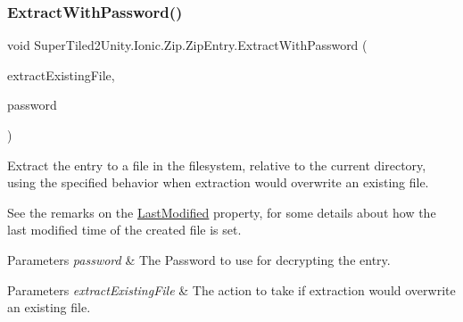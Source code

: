 \subsubsection{\texorpdfstring{Extract\+With\+Password()}{ExtractWithPassword()}\hspace{0.1cm}{\footnotesize\ttfamily [3/5]}}
{\footnotesize\ttfamily void Super\+Tiled2\+Unity.\+Ionic.\+Zip.\+Zip\+Entry.\+Extract\+With\+Password (\begin{DoxyParamCaption}\item[{\mbox{\hyperlink{namespace_super_tiled2_unity_1_1_ionic_1_1_zip_a3f8db7242d746d36b45114257b4fe4c0}{Extract\+Existing\+File\+Action}}}]{extract\+Existing\+File,  }\item[{string}]{password }\end{DoxyParamCaption})}



Extract the entry to a file in the filesystem, relative to the current directory, using the specified behavior when extraction would overwrite an existing file. 

See the remarks on the \mbox{\hyperlink{class_super_tiled2_unity_1_1_ionic_1_1_zip_1_1_zip_entry_acd1234fd27c216b59c166c2b96aba3dd}{Last\+Modified}} property, for some details about how the last modified time of the created file is set. 


\begin{DoxyParams}{Parameters}
{\em password} & The Password to use for decrypting the entry.\\
\hline
\end{DoxyParams}



\begin{DoxyParams}{Parameters}
{\em extract\+Existing\+File} & The action to take if extraction would overwrite an existing file. \\
\hline
\end{DoxyParams}
\mbox{\label{class_super_tiled2_unity_1_1_ionic_1_1_zip_1_1_zip_entry_af015f9309029c100d5e2fb03bb884024}} 
